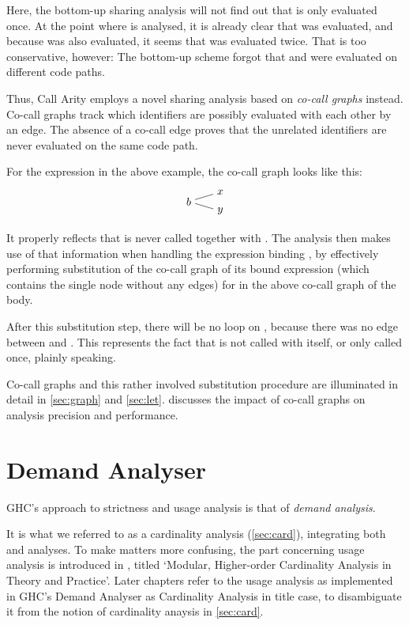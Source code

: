Here, the bottom-up sharing analysis will not find out that  is only evaluated once. 
At the point where  is analysed, it is already clear that  was evaluated, and because  was also evaluated, it seems that  was evaluated twice.
That is too conservative, however: The bottom-up scheme forgot that  and  were evaluated on different code paths.

Thus, Call Arity employs a novel sharing analysis based on \emph{co-call graphs} instead.
Co-call graphs track which identifiers are possibly evaluated with each other by an edge.
The absence of a co-call edge proves that the unrelated identifiers are never evaluated on the same code path.

For the  expression in the above example, the co-call graph looks like this:
\[  
  \begin{tikzpicture}[baseline={(0.base)}]
    \node (0) {$b$};
    \node at (1,0.3) (1) {$x$};
    \node at (1,-0.3) (2) {$y$};
    \draw (0) -- (1);
    \draw (0) -- (2);
  \end{tikzpicture}
\]

It properly reflects that  is never called together with .
The analysis then makes use of that information when handling the  expression binding , by effectively performing substitution of the co-call graph of its bound expression (which contains the single node  without any edges) for  in the above co-call graph of the body.

After this substitution step, there will be no loop on , because there was no edge between  and .
This represents the fact that  is not called with itself, or only called once, plainly speaking.

Co-call graphs and this rather involved substitution procedure are illuminated in detail in \cref{sec:graph} and \cref{sec:let}.
 discusses the impact of co-call graphs on analysis precision and performance.

\section{Demand Analyser}\label{sec:dmd}

GHC's approach to strictness and usage analysis is that of \emph{demand analysis}.

It is what we referred to as a cardinality analysis (\cref{sec:card}), integrating both \MinCard and \MaxCard analyses.
To make matters more confusing, the part concerning usage analysis is introduced in \textcite{card}, titled `Modular, Higher-order Cardinality Analysis in Theory and Practice'.
Later chapters refer to the usage analysis as implemented in GHC's Demand Analyser as Cardinality Analysis in title case, to disambiguate it from the notion of cardinality anaysis in \cref{sec:card}.

